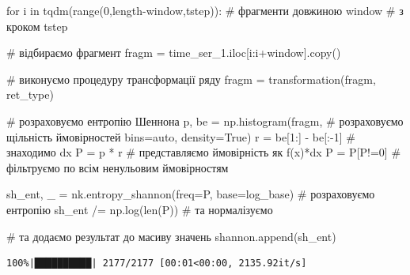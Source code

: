 \documentclass[
  letterpaper,
]{report}
\newenvironment{Shaded}{\begin{snugshade}}{\end{snugshade}}
\newcommand{\BuiltInTok}[1]{\textcolor[rgb]{0.00,0.23,0.31}{#1}}
\newcommand{\CommentTok}[1]{\textcolor[rgb]{0.37,0.37,0.37}{#1}}
\newcommand{\ControlFlowTok}[1]{\textcolor[rgb]{0.00,0.23,0.31}{#1}}
\newcommand{\DecValTok}[1]{\textcolor[rgb]{0.68,0.00,0.00}{#1}}
\newcommand{\KeywordTok}[1]{\textcolor[rgb]{0.00,0.23,0.31}{#1}}
\newcommand{\NormalTok}[1]{\textcolor[rgb]{0.00,0.23,0.31}{#1}}
\newcommand{\OperatorTok}[1]{\textcolor[rgb]{0.37,0.37,0.37}{#1}}
\newcommand{\StringTok}[1]{\textcolor[rgb]{0.13,0.47,0.30}{#1}}
\newcommand{\VariableTok}[1]{\textcolor[rgb]{0.07,0.07,0.07}{#1}}
\begin{document}
\begin{Shaded}
\begin{Highlighting}[]
\ControlFlowTok{for}\NormalTok{ i }\KeywordTok{in}\NormalTok{ tqdm(}\BuiltInTok{range}\NormalTok{(}\DecValTok{0}\NormalTok{,length}\OperatorTok{{-}}\NormalTok{window,tstep)):       }\CommentTok{\# фрагменти довжиною window  }
                                                   \CommentTok{\# з кроком tstep}

    \CommentTok{\# відбираємо фрагмент}
\NormalTok{    fragm }\OperatorTok{=}\NormalTok{ time\_ser\_1.iloc[i:i}\OperatorTok{+}\NormalTok{window].copy()   }

    \CommentTok{\# виконуємо процедуру трансформації ряду }
\NormalTok{    fragm }\OperatorTok{=}\NormalTok{ transformation(fragm, ret\_type)}

    \CommentTok{\# розраховуємо ентропію Шеннона}
\NormalTok{    p, be }\OperatorTok{=}\NormalTok{ np.histogram(fragm,         }\CommentTok{\# розраховуємо щільність ймовірностей}
\NormalTok{                        bins}\OperatorTok{=}\StringTok{\textquotesingle{}auto\textquotesingle{}}\NormalTok{, }
\NormalTok{                        density}\OperatorTok{=}\VariableTok{True}\NormalTok{)  }
\NormalTok{    r }\OperatorTok{=}\NormalTok{ be[}\DecValTok{1}\NormalTok{:] }\OperatorTok{{-}}\NormalTok{ be[:}\OperatorTok{{-}}\DecValTok{1}\NormalTok{]                }\CommentTok{\# знаходимо dx}
\NormalTok{    P }\OperatorTok{=}\NormalTok{ p }\OperatorTok{*}\NormalTok{ r                           }\CommentTok{\# представляємо ймовірність як f(x)*dx}
\NormalTok{    P }\OperatorTok{=}\NormalTok{ P[P}\OperatorTok{!=}\DecValTok{0}\NormalTok{]                         }\CommentTok{\# фільтруємо по всім ненульовим ймовірностям}

\NormalTok{    sh\_ent, \_ }\OperatorTok{=}\NormalTok{ nk.entropy\_shannon(freq}\OperatorTok{=}\NormalTok{P, base}\OperatorTok{=}\NormalTok{log\_base) }\CommentTok{\# розраховуємо ентропію }
\NormalTok{    sh\_ent }\OperatorTok{/=}\NormalTok{ np.log(}\BuiltInTok{len}\NormalTok{(P))                              }\CommentTok{\# та нормалізуємо}

    \CommentTok{\# та додаємо результат до масиву значень}
\NormalTok{    shannon.append(sh\_ent)}
\end{Highlighting}
\end{Shaded}

\begin{verbatim}
100%|██████████| 2177/2177 [00:01<00:00, 2135.92it/s]
\end{verbatim}
\end{document}
